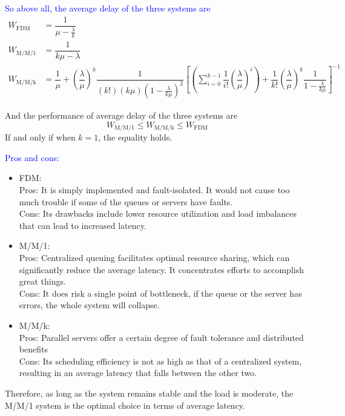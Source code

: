 \begin{homeworkProblem}
\textcolor{blue}{So above all, the average delay of the three systems are}
\begin{align*}
W_{\text{FDM}} &= \dfrac{1}{\mu-\frac{\lambda}{k}} \\
W_{\text{M/M/1}} &= \dfrac{1}{k\mu-\lambda} \\
W_{\text{M/M/k}} &= \dfrac{1}{\mu} + \left(\dfrac{\lambda}{\mu}\right)^k\dfrac{1}{(k!)(k\mu)(1-\frac{\lambda}{k\mu})^2}\left[\left(\sum_{i=0}^{k-1}\dfrac{1}{i!}\left(\dfrac{\lambda}{\mu}\right)^i\right)+\dfrac{1}{k!}\left(\dfrac{\lambda}{\mu}\right)^k\dfrac{1}{1-\frac{\lambda}{k\mu}}\right]^{-1}
\end{align*}

And the performance of average delay of the three systems are
$$W_{\text{M/M/1}} \leq W_{\text{M/M/k}} \leq W_{\text{FDM}}$$
If and only if when $k=1$, the equality holds.

\textcolor{blue}{Pros and cons:}
\begin{itemize}
\item FDM: \\
Pros: It is simply implemented and fault-isolated. It would not cause too much trouble if some of the queues or servers have faults. \\
Cons: Its drawbacks include lower resource utilization and load imbalances that can lead to increased latency.

\item M/M/1: \\
Pros: Centralized queuing facilitates optimal resource sharing, which can significantly reduce the average latency. It concentrates efforts to accomplish great things. \\
Cons: It does risk a single point of bottleneck, if the queue or the server has errors, the whole system will collapse.

\item M/M/k: \\
Pros: Parallel servers offer a certain degree of fault tolerance and distributed benefits \\
Cons: Its scheduling efficiency is not as high as that of a centralized system, resulting in an average latency that falls between the other two.
\end{itemize}

Therefore, as long as the system remains stable and the load is moderate, the M/M/1 system is the optimal choice in terms of average latency.


\end{homeworkProblem}
